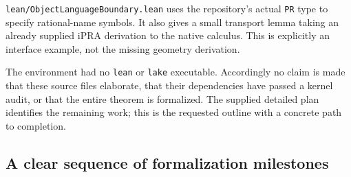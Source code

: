 \texttt{lean/ObjectLanguageBoundary.lean} uses the repository's actual
\texttt{PR} type to specify rational-name symbols. It also gives a small
transport lemma taking an already supplied iPRA derivation to the
native calculus. This is explicitly an interface example, not the
missing geometry derivation.

The environment had no \texttt{lean} or \texttt{lake} executable.
Accordingly no claim is made that these source files elaborate, that
their dependencies have passed a kernel audit, or that the entire
theorem is formalized. The supplied detailed plan identifies the
remaining work; this is the requested outline with a concrete path to
completion.

\subsection{A clear sequence of formalization milestones}
